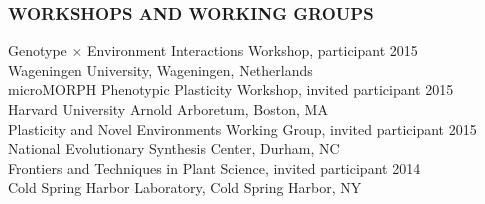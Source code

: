\documentclass[12pt,english]{article}
\begin{document}
\subsubsection*{WORKSHOPS AND WORKING GROUPS}
\vspace{-0.5ex}
\hspace*{1.0em} Genotype $\times$ Environment Interactions Workshop, participant
\hfill 
2015\\
\hspace*{2.0em}  Wageningen University, Wageningen, Netherlands
\vspace{1ex}\\
\hspace*{1.0em} microMORPH Phenotypic Plasticity Workshop, invited participant
\hfill 
2015\\
\hspace*{2.0em}  Harvard University Arnold Arboretum, Boston, MA
\vspace{1ex}\\
\hspace*{1.0em} Plasticity and Novel Environments Working Group, invited participant
\hfill 
2015\\
\hspace*{2.0em}  National Evolutionary Synthesis Center, Durham, NC
\vspace{1ex}\\
\hspace*{1.0em} Frontiers and Techniques in Plant Science, invited participant
\hfill 
2014\\
\hspace*{2.0em}  Cold Spring Harbor Laboratory, Cold Spring Harbor, NY
\vspace{1ex}

\end{document}
